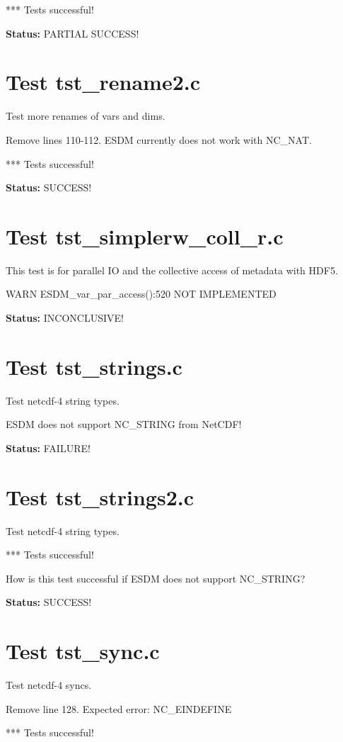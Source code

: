*** Tests successful!

{\bf \large Status: } PARTIAL SUCCESS!

\section{Test tst\_rename2.c}

Test more renames of vars and dims.

Remove lines 110-112. ESDM currently does not work with NC_NAT.

*** Tests successful!

{\bf \large Status: } SUCCESS!

\section{Test tst\_simplerw\_coll\_r.c}

This test is for parallel IO and the collective access of metadata with HDF5.

WARN ESDM\_var\_par\_access():520 NOT IMPLEMENTED

{\bf \large Status: } INCONCLUSIVE!

\section{Test tst\_strings.c}

Test netcdf-4 string types.

ESDM does not support NC\_STRING from NetCDF!

{\bf \large Status: } FAILURE!

\section{Test tst\_strings2.c}

Test netcdf-4 string types.

*** Tests successful!

How is this test successful if ESDM does not support NC\_STRING?

{\bf \large Status: } SUCCESS!

\section{Test tst\_sync.c}

Test netcdf-4 syncs.

Remove line 128. Expected error: NC\_EINDEFINE

*** Tests successful!

